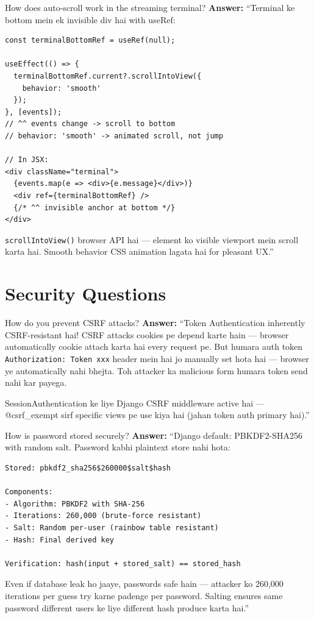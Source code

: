 \documentclass[11pt,a4paper,twoside]{report}
\begin{document}
\begin{interviewbox}{How does auto-scroll work in the streaming terminal?}
\textbf{Answer:} ``Terminal ke bottom mein ek invisible div hai with useRef:

\begin{lstlisting}[style=jsstyle]
const terminalBottomRef = useRef(null);

useEffect(() => {
  terminalBottomRef.current?.scrollIntoView({
    behavior: 'smooth'
  });
}, [events]);
// ^^ events change -> scroll to bottom
// behavior: 'smooth' -> animated scroll, not jump

// In JSX:
<div className="terminal">
  {events.map(e => <div>{e.message}</div>)}
  <div ref={terminalBottomRef} />
  {/* ^^ invisible anchor at bottom */}
</div>
\end{lstlisting}

\texttt{scrollIntoView()} browser API hai --- element ko visible viewport mein scroll karta hai. Smooth behavior CSS animation lagata hai for pleasant UX.''
\end{interviewbox}

\section{Security Questions}

\begin{interviewbox}{How do you prevent CSRF attacks?}
\textbf{Answer:} ``Token Authentication inherently CSRF-resistant hai! CSRF attacks cookies pe depend karte hain --- browser automatically cookie attach karta hai every request pe. But humara auth token \texttt{Authorization: Token xxx} header mein hai jo manually set hota hai --- browser ye automatically nahi bhejta. Toh attacker ka malicious form humara token send nahi kar payega.

SessionAuthentication ke liye Django CSRF middleware active hai --- @csrf\_exempt sirf specific views pe use kiya hai (jahan token auth primary hai).''
\end{interviewbox}

\begin{interviewbox}{How is password stored securely?}
\textbf{Answer:} ``Django default: PBKDF2-SHA256 with random salt. Password kabhi plaintext store nahi hota:

\begin{lstlisting}[language={}]
Stored: pbkdf2_sha256$260000$salt$hash

Components:
- Algorithm: PBKDF2 with SHA-256
- Iterations: 260,000 (brute-force resistant)
- Salt: Random per-user (rainbow table resistant)
- Hash: Final derived key

Verification: hash(input + stored_salt) == stored_hash
\end{lstlisting}

Even if database leak ho jaaye, passwords safe hain --- attacker ko 260,000 iterations per guess try karne padenge per password. Salting ensures same password different users ke liye different hash produce karta hai.''
\end{interviewbox}
\end{document}
